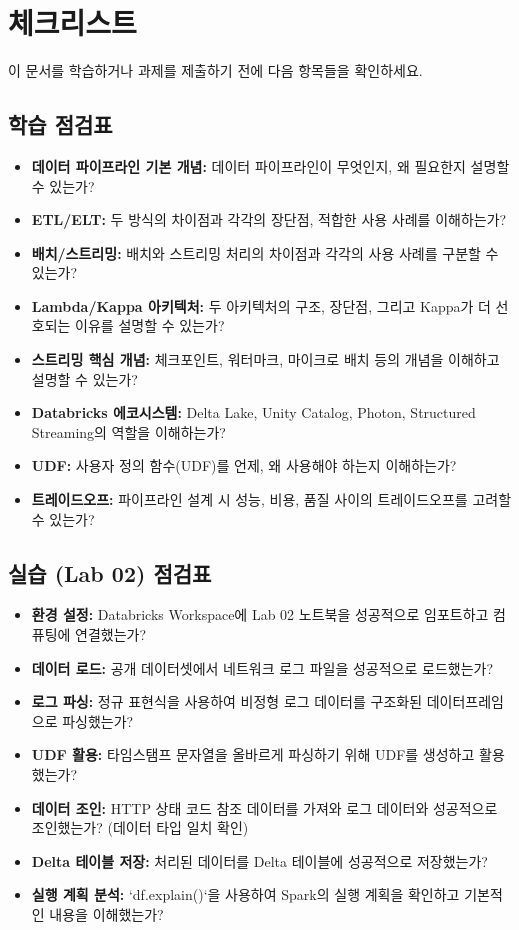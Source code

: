 \documentclass[11pt,a4paper]{article}
\begin{document}
\newpage
\section{체크리스트}

이 문서를 학습하거나 과제를 제출하기 전에 다음 항목들을 확인하세요.

\subsection{학습 점검표}
\begin{itemize}
    \item \textbf{데이터 파이프라인 기본 개념:} 데이터 파이프라인이 무엇인지, 왜 필요한지 설명할 수 있는가?
    \item \textbf{ETL/ELT:} 두 방식의 차이점과 각각의 장단점, 적합한 사용 사례를 이해하는가?
    \item \textbf{배치/스트리밍:} 배치와 스트리밍 처리의 차이점과 각각의 사용 사례를 구분할 수 있는가?
    \item \textbf{Lambda/Kappa 아키텍처:} 두 아키텍처의 구조, 장단점, 그리고 Kappa가 더 선호되는 이유를 설명할 수 있는가?
    \item \textbf{스트리밍 핵심 개념:} 체크포인트, 워터마크, 마이크로 배치 등의 개념을 이해하고 설명할 수 있는가?
    \item \textbf{Databricks 에코시스템:} Delta Lake, Unity Catalog, Photon, Structured Streaming의 역할을 이해하는가?
    \item \textbf{UDF:} 사용자 정의 함수(UDF)를 언제, 왜 사용해야 하는지 이해하는가?
    \item \textbf{트레이드오프:} 파이프라인 설계 시 성능, 비용, 품질 사이의 트레이드오프를 고려할 수 있는가?
\end{itemize}

\subsection{실습 (Lab 02) 점검표}
\begin{itemize}
    \item \textbf{환경 설정:} Databricks Workspace에 Lab 02 노트북을 성공적으로 임포트하고 컴퓨팅에 연결했는가?
    \item \textbf{데이터 로드:} 공개 데이터셋에서 네트워크 로그 파일을 성공적으로 로드했는가?
    \item \textbf{로그 파싱:} 정규 표현식을 사용하여 비정형 로그 데이터를 구조화된 데이터프레임으로 파싱했는가?
    \item \textbf{UDF 활용:} 타임스탬프 문자열을 올바르게 파싱하기 위해 UDF를 생성하고 활용했는가?
    \item \textbf{데이터 조인:} HTTP 상태 코드 참조 데이터를 가져와 로그 데이터와 성공적으로 조인했는가? (데이터 타입 일치 확인)
    \item \textbf{Delta 테이블 저장:} 처리된 데이터를 Delta 테이블에 성공적으로 저장했는가?
    \item \textbf{실행 계획 분석:} `df.explain()`을 사용하여 Spark의 실행 계획을 확인하고 기본적인 내용을 이해했는가?
\end{itemize}
\end{document}
